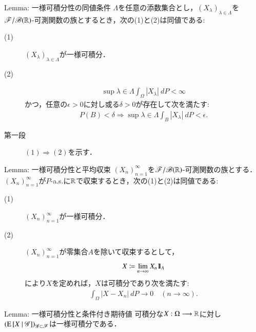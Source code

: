 	\begin{itembox}[l]{Lemma: 一様可積分性の同値条件}
		$\Lambda$を任意の添数集合とし，$(X_\lambda)_{\lambda \in \Lambda}$を
		$\mathscr{F}/\mathscr{B}(\mathbb{R})$-可測関数の族とするとき，次の(1)と(2)は同値である:
		\begin{description}
			\item[(1)] $(X_\lambda)_{\lambda \in \Lambda}$が一様可積分．
			\item[(2)] 
				\begin{align}
					\sup{\lambda \in \Lambda}\int_\Omega |X_\lambda|\ dP < \infty
				\end{align}
				かつ，任意の$\epsilon > 0$に対し或る$\delta > 0$が存在して次を満たす:
				\begin{align}
					P(B) < \delta
					\Rightarrow \sup{\lambda \in \Lambda}\int_B |X_\lambda|\ dP < \epsilon.
				\end{align}
		\end{description}
	\end{itembox}
	
	\begin{prf}\mbox{}
		\begin{description}
			\item[第一段]
				$(1) \Rightarrow (2)$を示す．
		\end{description}
	\end{prf}
	
	\begin{itembox}[l]{Lemma: 一様可積分性と平均収束}
		$(X_n)_{n=1}^\infty$を$\mathscr{F}/\mathscr{B}(\mathbb{R})$-可測関数の族とする．
		$(X_n)_{n=1}^\infty$が$P$-a.s.に$\mathbb{R}$で収束するとき，次の(1)と(2)は同値である:
		\begin{description}
			\item[(1)] $(X_n)_{n=1}^\infty$が一様可積分．
			\item[(2)] $(X_n)_{n=1}^\infty$が零集合$A$を除いて収束するとして，
				\begin{align}
					X \coloneqq \lim_{n \to \infty} X_n \mbox{1}\hspace{-0.25em}\mbox{l}_A
				\end{align}
				により$X$を定めれば，$X$は可積分であり次を満たす:
				\begin{align}
					\int_\Omega |X - X_n|\ dP 
					\longrightarrow 0
					\quad (n \longrightarrow \infty).
				\end{align}
		\end{description}
	\end{itembox}
	
	\begin{itembox}[l]{Lemma: 一様可積分性と条件付き期待値}\label{lem:uniformly_integrability_and_conditional_expectations}
		可積分な$X:\Omega \longrightarrow \mathbb{R}$に対し
		$\left( \operatorname{E} \left[ X \ \middle|\ \mathscr{G} \right] \right)_{\mathscr{G} \subset \mathscr{F}}$は一様可積分である．
	\end{itembox}
	
